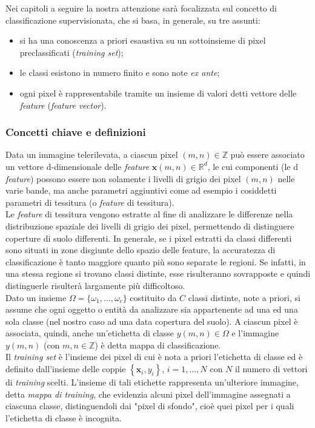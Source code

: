 Nei capitoli a seguire la nostra attenzione sarà focalizzata sul concetto di classificazione supervisionata, che si basa, in generale, su tre assunti:
\begin{itemize}
\item si ha una conoscenza a priori esaustiva su un sottoinsieme di pixel preclassificati (\emph{training set});
\item le classi esistono in numero finito e sono note \emph{ex ante};    
\item ogni pixel è rappresentabile tramite un insieme di valori detti vettore delle \emph{feature} (\emph{feature vector}).
\end{itemize}


\subsubsection*{Concetti chiave e definizioni}
Data un immagine telerilevata, a ciascun pixel $(m,n) \in \mathbb{Z}$ può essere associato un vettore d-dimensionale delle \emph{feature} $\textbf{x}(m,n)\in \mathbb{R}^d$, le cui componenti (le d \emph{feature}) possono essere non solamente i livelli di grigio dei pixel $(m,n)$ nelle varie bande, ma anche parametri aggiuntivi come ad esempio i cosiddetti parametri di tessitura (o \emph{feature} di tessitura).\\

Le \emph{feature} di tessitura vengono estratte al fine di analizzare le differenze nella distribuzione spaziale dei livelli di grigio dei pixel, permettendo di distinguere coperture di suolo differenti. In generale, se i pixel estratti da classi differenti sono situati in zone disgiunte dello spazio delle feature, la accuratezza di classificazione è tanto maggiore quanto più sono separate le regioni. Se infatti, in una stessa regione si trovano classi distinte, esse risulteranno sovrapposte e quindi distinguerle risulterà largamente più difficoltoso.
\\

Dato un insieme $\Omega =\lbrace\omega_1,\ldots, \omega_c\rbrace$ costituito da $C$ classi distinte, note a priori, si assume che ogni oggetto o entità da analizzare sia appartenente ad una ed una sola classe (nel nostro caso ad una data copertura del suolo). A ciascun pixel è associata, quindi, anche un'etichetta di classe $y(m,n) \in \Omega$ e l'immagine $y(m,n)$ (con $m,n\in \mathbb{Z}$) è detta mappa di classificazione.
\\

Il \emph{training set} è l'insieme dei pixel di cui è nota a priori l'etichetta di classe ed è definito dall'insieme delle coppie $\left\lbrace \mathbf{x}_i,y_i \right\rbrace $, $i=1,\ldots,N$ con $N$ il numero di vettori di \emph{training} scelti. L'insieme di tali etichette rappresenta un'ulteriore immagine, detta  \emph{mappa di training}, che evidenzia alcuni pixel dell'immagine assegnati a ciascuna classe, distinguendoli dai "pixel di sfondo", cioè quei pixel per i quali l'etichetta di classe è incognita.



